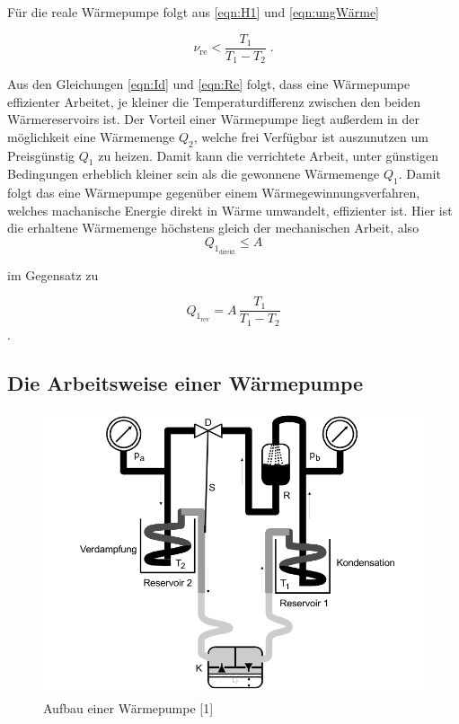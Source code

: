 Für die reale Wärmepumpe folgt aus \ref{eqn:H1} und \ref{eqn:ungWärme}

\begin{equation}
    \nu_\text{re} < \frac{T_1}{T_1 - T_2} \; \text{.}
    \label{eqn:Re}
\end{equation}

Aus den Gleichungen \ref{eqn:Id} und \ref{eqn:Re} folgt, dass eine Wärmepumpe effizienter Arbeitet, je kleiner die Temperaturdifferenz
zwischen den beiden Wärmereservoirs ist. Der Vorteil einer Wärmepumpe liegt außerdem in der möglichkeit eine Wärmemenge $Q_2$, welche frei Verfügbar ist 
auszunutzen um Preisgünstig $Q_1$ zu heizen. Damit kann die verrichtete Arbeit, unter günstigen Bedingungen erheblich kleiner sein als die gewonnene Wärmemenge $Q_1$.
Damit folgt das eine Wärmepumpe gegenüber einem Wärmegewinnungsverfahren, welches machanische Energie direkt in Wärme umwandelt, effizienter ist.
Hier ist die erhaltene Wärmemenge höchstens gleich der mechanischen Arbeit, also
\begin{equation*}
    Q_{1_\text{direkt}}\leq A
\end{equation*}

im Gegensatz zu

\begin{equation*}
    Q_{1_\text{rev}}=A\,\frac{T_1}{T_1-T_2}
\end{equation*}.



\subsection{Die Arbeitsweise einer Wärmepumpe}
\begin{figure}
    \centering
    \includegraphics[scale=0.4]{aufbau.pdf}
    \caption{Aufbau einer Wärmepumpe [1]}
    \label{fig:aufbau}
\end{figure}

